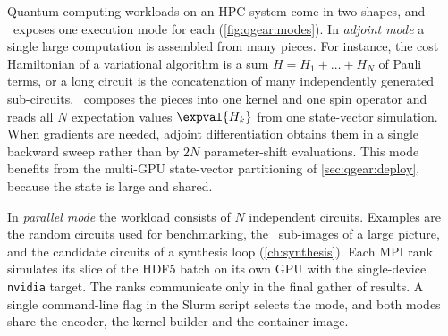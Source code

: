 Quantum-computing workloads on an HPC system come in two shapes, and \qgear\ exposes one execution mode for each (\cref{fig:qgear:modes}). In \emph{adjoint mode} a single large computation is assembled from many pieces. For instance, the cost Hamiltonian of a variational algorithm is a sum $H=H_{1}+\dots+H_{N}$ of Pauli terms, or a long circuit is the concatenation of many independently generated sub-circuits. \qgear\ composes the pieces into one kernel and one spin operator and reads all $N$ expectation values $\expval{H_{k}}$ from one state-vector simulation. When gradients are needed, adjoint differentiation \cite{jones2020adjoint} obtains them in a single backward sweep rather than by $2N$ parameter-shift evaluations. This mode benefits from the multi-GPU state-vector partitioning of \cref{sec:qgear:deploy}, because the state is large and shared.

In \emph{parallel mode} the workload consists of $N$ independent circuits. Examples are the random circuits used for benchmarking, the \qcrank\ sub-images of a large picture, and the candidate circuits of a synthesis loop (\cref{ch:synthesis}). Each MPI rank simulates its slice of the HDF5 batch on its own GPU with the single-device \texttt{nvidia} target. The ranks communicate only in the final gather of results. A single command-line flag in the Slurm script selects the mode, and both modes share the encoder, the kernel builder and the container image.

